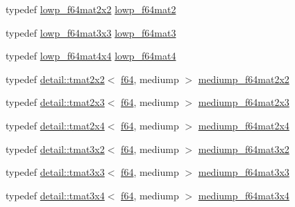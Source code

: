 \begin{DoxyCompactItemize}
\item 
typedef \hyperlink{group__gtc__type__precision_ga38e41c5332b4eb20b23b4ed1f06608d4}{lowp\+\_\+f64mat2x2} \hyperlink{group__gtc__type__precision_ga2984b3b0b6ee0657044d186bb875b4e3}{lowp\+\_\+f64mat2}
\item 
typedef \hyperlink{group__gtc__type__precision_ga3b636bef3048da2f7935eae13e66f7b3}{lowp\+\_\+f64mat3x3} \hyperlink{group__gtc__type__precision_ga4acbda53fb7ff9568c0a2786fad450b8}{lowp\+\_\+f64mat3}
\item 
typedef \hyperlink{group__gtc__type__precision_gab7d0922ed8d93ee3ce995858feb41231}{lowp\+\_\+f64mat4x4} \hyperlink{group__gtc__type__precision_ga4378d9384f1b24848043ccb02dcf2959}{lowp\+\_\+f64mat4}
\item 
typedef \hyperlink{structglm_1_1detail_1_1tmat2x2}{detail\+::tmat2x2}$<$ \hyperlink{group__gtc__type__precision_ga2bba392e555124b36cde6abba349bab3}{f64}, mediump $>$ \hyperlink{group__gtc__type__precision_gacfa9f872c78d9e8b8e6c5dd0088db8fc}{mediump\+\_\+f64mat2x2}
\item 
typedef \hyperlink{structglm_1_1detail_1_1tmat2x3}{detail\+::tmat2x3}$<$ \hyperlink{group__gtc__type__precision_ga2bba392e555124b36cde6abba349bab3}{f64}, mediump $>$ \hyperlink{group__gtc__type__precision_ga6f463cb5e9b4e5c07a385843ed50e6b8}{mediump\+\_\+f64mat2x3}
\item 
typedef \hyperlink{structglm_1_1detail_1_1tmat2x4}{detail\+::tmat2x4}$<$ \hyperlink{group__gtc__type__precision_ga2bba392e555124b36cde6abba349bab3}{f64}, mediump $>$ \hyperlink{group__gtc__type__precision_ga65c67789f7e2ff605d8f48dc3750a515}{mediump\+\_\+f64mat2x4}
\item 
typedef \hyperlink{structglm_1_1detail_1_1tmat3x2}{detail\+::tmat3x2}$<$ \hyperlink{group__gtc__type__precision_ga2bba392e555124b36cde6abba349bab3}{f64}, mediump $>$ \hyperlink{group__gtc__type__precision_gad6408472435fce994a3bb9d14d321ddd}{mediump\+\_\+f64mat3x2}
\item 
typedef \hyperlink{structglm_1_1detail_1_1tmat3x3}{detail\+::tmat3x3}$<$ \hyperlink{group__gtc__type__precision_ga2bba392e555124b36cde6abba349bab3}{f64}, mediump $>$ \hyperlink{group__gtc__type__precision_ga871b69a221dae7461aa746e6e6d372fc}{mediump\+\_\+f64mat3x3}
\item 
typedef \hyperlink{structglm_1_1detail_1_1tmat3x4}{detail\+::tmat3x4}$<$ \hyperlink{group__gtc__type__precision_ga2bba392e555124b36cde6abba349bab3}{f64}, mediump $>$ \hyperlink{group__gtc__type__precision_gac3b0ca6d79631a2480cee8897dcd79ec}{mediump\+\_\+f64mat3x4}

\end{DoxyCompactItemize}
